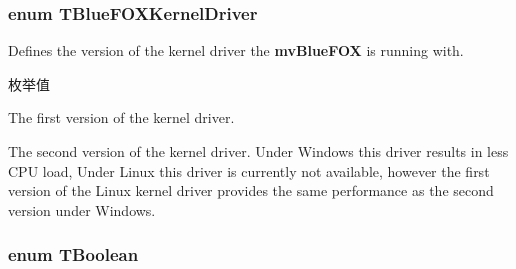 \hypertarget{group___common_interface_ga345b9d87a1305eb7b86a78750bd9e69f}{
\subsubsection[{T\+Blue\+F\+O\+X\+Kernel\+Driver}]{\setlength{\rightskip}{0pt plus 5cm}enum {\bf T\+Blue\+F\+O\+X\+Kernel\+Driver}}}\label{group___common_interface_ga345b9d87a1305eb7b86a78750bd9e69f}


Defines the version of the kernel driver the {\bfseries mv\+Blue\+F\+O\+X} is running with. 

\begin{Desc}
\item[枚举值]\par
\begin{description}
\item[{\em 
\hypertarget{group___common_interface_gga345b9d87a1305eb7b86a78750bd9e69fa51aaa69dccfaabec3836fa7e5e1ca4fa}{bfkdmv\+Blue\+F\+O\+X}\label{group___common_interface_gga345b9d87a1305eb7b86a78750bd9e69fa51aaa69dccfaabec3836fa7e5e1ca4fa}
}]The first version of the kernel driver. \item[{\em 
\hypertarget{group___common_interface_gga345b9d87a1305eb7b86a78750bd9e69fa0da9d56f43e35d1cb9ed753a1754de97}{bfkdmv\+Blue\+F\+O\+X2}\label{group___common_interface_gga345b9d87a1305eb7b86a78750bd9e69fa0da9d56f43e35d1cb9ed753a1754de97}
}]The second version of the kernel driver. Under Windows\textregistered{} this driver results in less C\+P\+U load, Under Linux this driver is currently not available, however the first version of the Linux kernel driver provides the same performance as the second version under Windows\textregistered{}. \end{description}
\end{Desc}
\hypertarget{group___common_interface_ga43c995be18b0dde1eeb4a16849c58968}{
\subsubsection[{T\+Boolean}]{\setlength{\rightskip}{0pt plus 5cm}enum {\bf T\+Boolean}}}\label{group___common_interface_ga43c995be18b0dde1eeb4a16849c58968}


